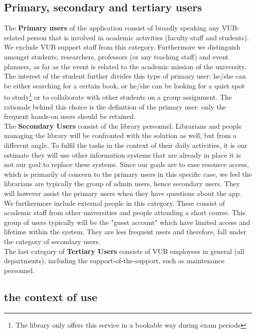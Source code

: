 \documentclass[a4paper, 11pt]{article}
\begin{document}
\subsection{Primary, secondary and tertiary users}
The \textbf{Primary users} of the application consist of broadly speaking any VUB-related person that is involved in academic activities (faculty staff and students). We exclude VUB support staff from this category. Furthermore we distinguish amongst students, researchers, professors (or any teaching staff) and event planners, as far as the event is related to the academic mission of the university. The interest of the student further divides this type of primary user: he/she can be either searching for a certain book, or he/she can be looking for a quiet spot to study\footnote{The library only offers this service in a bookable way during exam periods} or to collaborate with other students on a group assignment. The rationale behind this choice is the definition of the primary user: only the frequent hands-on users should be retained.\\
The \textbf{Secondary Users} consist of the library personnel. Librarians and people managing the library will be confronted with the solution as well, but from a different angle. To fulfil the tasks in the context of their daily activities, it is our estimate they will use other information systems that are already in place it is not our goal to replace these systems. Since our goals are to ease resource access, which is primarily of concern to the primary users in this specific case, we feel the librarians are typically the group of admin users, hence secondary users. They will however assist the primary users when they have questions about the app. We furthermore include external people in this category. These consist of academic staff from other universities and people attending a short course. This group of users typically will be the "guest account" which have limited access and lifetime within the system. They are less frequent users and therefore, fall under the category of secondary users.\\
The last category of \textbf{Tertiary Users} consists of VUB employees in general (all departments), including the support-of-the-support, such as maintenance personnel. 

\subsection{the context of use}
\end{document}
